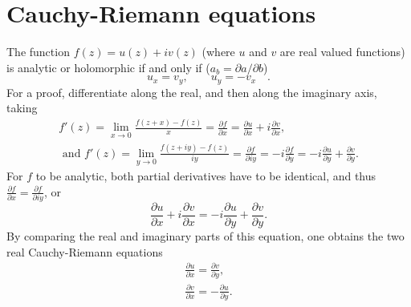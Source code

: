 \section{Cauchy-Riemann equations}
 The function $f(z)=u(z)+iv(z)$ (where $u$ and $v$ are real valued functions) is
 {analytic or holomorphic} if and only if
 ($a_b=\partial a/\partial b$)
 \begin{equation}
u_x=v_y, \qquad u_y=-v_x\quad .
\end{equation}
{\color{OliveGreen}
\bproof
For a proof, differentiate along the real, and then along the imaginary axis,
taking
\begin{equation}
\begin{split}
f'(z) =\lim_{x\rightarrow 0}\frac{f(z+x)-f(z)}{x}=\frac{\partial f}{\partial x}=   \frac{\partial u}{\partial x}+i\frac{\partial v}{\partial x},\\
\textrm { and } f'(z) =\lim_{y\rightarrow 0}\frac{f(z+iy)-f(z)}{iy}=\frac{\partial f}{\partial iy}= -i\frac{\partial f}{\partial y}=   -i\frac{\partial u}{\partial y}+ \frac{\partial v}{\partial y}.
\end{split}
\end{equation}
For $f$ to be analytic, both partial derivatives have to be identical, and thus $\frac{\partial f}{\partial x}=\frac{\partial f}{\partial iy}$, or
\begin{equation}
\frac{\partial u}{\partial x}+i\frac{\partial v}{\partial x}=   -i\frac{\partial u}{\partial y}+ \frac{\partial v}{\partial y}.
\end{equation}
By comparing the real and imaginary parts of this equation, one obtains the two real Cauchy-Riemann equations
\begin{equation}
\begin{split}
\frac{\partial u}{\partial x}=   \frac{\partial v}{\partial y},\\
\frac{\partial v}{\partial x}=   -\frac{\partial u}{\partial y}.
\end{split}
\end{equation}
\eproof
}

